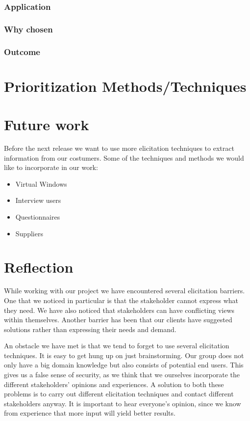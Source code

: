 \documentclass[a4paper]{article}
\begin{document}
	    \subsubsection{Application}
    	\subsubsection{Why chosen}
    	\subsubsection{Outcome}


	\section{Prioritization Methods/Techniques}

  \section{Future work}
Before the next release we want to use more elicitation techniques to extract
information from our costumers. Some of the techniques and methods we would
like to incorporate in our work:

  \begin{itemize}
  	\item Virtual Windows
  	\item Interview users
  	\item Questionnaires
  	\item Suppliers 
  \end{itemize}
 
  \section{Reflection}

While working with our project we have encountered several elicitation barriers. One that we noticed in particular is that the stakeholder cannot express what they need. We have also noticed that stakeholders can have conflicting views within themselves. Another barrier has been that our clients have suggested solutions rather than expressing their needs and demand.

An obstacle we have met is that we tend to forget to use several elicitation techniques. It is easy to get hung up on just brainstorming. Our group does not only have a big domain knowledge but also consists of potential end users. This gives us a false sense of security, as we think that we ourselves incorporate the different stakeholders' opinions and experiences. A solution to both these problems is to carry out different elicitation techniques and contact different stakeholders anyway. It is important to hear everyone's opinion, since we know from experience that more input will yield better results.
\end{document}

